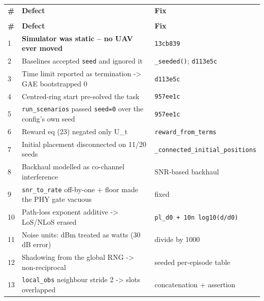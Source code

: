 \documentclass[11pt,a4paper]{article}
\begin{document}
\begingroup\small
\setlength{\LTleft}{0pt}\setlength{\LTright}{\fill}
\setlength{\LTpre}{6pt}\setlength{\LTpost}{10pt}
\begin{longtable}{@{}>{\raggedleft\arraybackslash}p{0.7cm}>{\raggedright\arraybackslash}p{6.1cm}>{\raggedright\arraybackslash}p{8.55cm}@{}}
\uavtoprule
\rowcolor{uavlight}\textbf{\#} & \textbf{Defect} & \textbf{Fix} \\
\uavmidrule
\endfirsthead
\multicolumn{3}{@{}l}{\footnotesize\itshape\color{uavmuted} the defect log, continued}\\
\uavtoprule
\rowcolor{uavlight}\textbf{\#} & \textbf{Defect} & \textbf{Fix} \\
\uavmidrule
\endhead
\textcolor{uavmuted}{1} & \textbf{Simulator was static -- no UAV ever moved} & \texttt{13cb839} \\
\rowcolor{uavzebra}
\textcolor{uavmuted}{2} & Baselines accepted \texttt{seed} and ignored it & \texttt{\_seeded()}; \texttt{d113e5c} \\
\textcolor{uavmuted}{3} & Time limit reported as termination -> GAE bootstrapped 0 & \texttt{d113e5c} \\
\rowcolor{uavzebra}
\textcolor{uavmuted}{4} & Centred-ring start pre-solved the task & \texttt{957ee1c} \\
\textcolor{uavmuted}{5} & \texttt{run\_scenarios} passed \texttt{seed=0} over the config's own seed & \texttt{957ee1c} \\
\rowcolor{uavzebra}
\textcolor{uavmuted}{6} & Reward eq (23) negated only U\_t & \texttt{reward\_from\_terms} \\
\textcolor{uavmuted}{7} & Initial placement disconnected on 11/20 seeds & \texttt{\_connected\_initial\_positions} \\
\rowcolor{uavzebra}
\textcolor{uavmuted}{8} & Backhaul modelled as co-channel interference & SNR-based backhaul \\
\textcolor{uavmuted}{9} & \texttt{snr\_to\_rate} off-by-one + floor made the PHY gate vacuous & fixed \\
\rowcolor{uavzebra}
\textcolor{uavmuted}{10} & Path-loss exponent additive -> LoS/NLoS erased & \texttt{pl\_d0 + 10n log10(d/\allowbreak{}d0)} \\
\textcolor{uavmuted}{11} & Noise units: dBm treated as watts (30 dB error) & divide by 1000 \\
\rowcolor{uavzebra}
\textcolor{uavmuted}{12} & Shadowing from the global RNG -> non-reciprocal & seeded per-episode table \\
\textcolor{uavmuted}{13} & \texttt{local\_obs} neighbour stride 2 -> slots overlapped & concatenation + assertion \\

\end{longtable}
\end{document}
